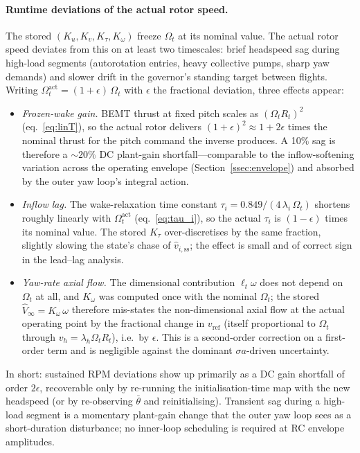 \documentclass[11pt,a4paper]{article}
\newcommand{\OmegaT}{\Omega_t}
\newcommand{\Rt}{R_t}
\newcommand{\btheta}{\bar{\theta}}
\begin{document}
\paragraph{Runtime deviations of the actual rotor speed.}
The stored \((K_u,K_v,K_\tau,K_\omega)\) freeze \(\OmegaT\) at its nominal value.
The actual rotor speed deviates from this on at least two timescales:
brief headspeed sag during high-load segments (autorotation entries,
heavy collective pumps, sharp yaw demands) and slower drift in the
governor's standing target between flights. Writing
\(\OmegaT^{\text{act}} = (1+\epsilon)\,\OmegaT\) with \(\epsilon\) the
fractional deviation, three effects appear:
\begin{itemize}[leftmargin=*,itemsep=4pt,topsep=2pt]
\item \emph{Frozen-wake gain.} BEMT thrust at fixed pitch scales as
\((\OmegaT\Rt)^2\) (eq.~\eqref{eq:linT}), so the actual rotor
delivers \((1+\epsilon)^2\approx 1+2\epsilon\) times the nominal
thrust for the pitch command the inverse produces. A 10\% sag is
therefore a \(\sim 20\%\) DC plant-gain shortfall---comparable to
the inflow-softening variation across the operating envelope
(Section~\ref{ssec:envelope}) and absorbed by the outer yaw loop's
integral action.
\item \emph{Inflow lag.} The wake-relaxation time constant
\(\tau_i = 0.849/(4\,\lambda_i\,\OmegaT)\) shortens roughly linearly
with \(\OmegaT^{\text{act}}\) (eq.~\eqref{eq:tau_i}), so the actual
\(\tau_i\) is \((1-\epsilon)\) times its nominal value. The stored
\(K_\tau\) over-discretises by the same fraction, slightly slowing the
state's chase of \(\hat v_{i,\text{ss}}\); the effect is small and
of correct sign in the lead--lag analysis.
\item \emph{Yaw-rate axial flow.} The dimensional contribution
\(\ell_t\omega\) does not depend on \(\OmegaT\) at all, and \(K_\omega\)
was computed once with the nominal \(\OmegaT\); the stored
\(\hat V_\infty = K_\omega\,\omega\) therefore mis-states the
non-dimensional axial flow at the actual operating point by the
fractional change in \(v_{\text{ref}}\) (itself proportional to
\(\OmegaT\) through \(v_h=\lambda_h\OmegaT\Rt\)), i.e.\ by
\(\epsilon\). This is a second-order correction on a
first-order term and is negligible against the dominant
\(\sigma a\)-driven uncertainty.
\end{itemize}
\noindent
In short: sustained RPM deviations show up primarily as a DC
gain shortfall of order \(2\epsilon\), recoverable only by re-running
the initialisation-time map with the new headspeed (or by re-observing
\(\btheta\) and reinitialising). Transient sag during a high-load segment
is a momentary plant-gain change that the outer yaw loop sees as a
short-duration disturbance; no inner-loop scheduling is required at
RC envelope amplitudes.
\end{document}
